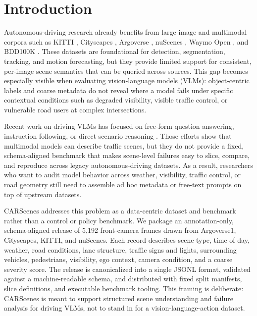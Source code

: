 \section{Introduction}

Autonomous-driving research already benefits from large image and multimodal corpora such as KITTI \cite{RefWorks:geiger2013vision}, Cityscapes \cite{RefWorks:cordts2016cityscapes}, Argoverse \cite{RefWorks:chang2019argoverse}, nuScenes \cite{RefWorks:caesar2020nuscenes}, Waymo Open \cite{RefWorks:sun2020scalability}, and BDD100K \cite{RefWorks:yu2020bdd100k}. These datasets are foundational for detection, segmentation, tracking, and motion forecasting, but they provide limited support for consistent, per-image scene semantics that can be queried across sources. This gap becomes especially visible when evaluating vision-language models (VLMs): object-centric labels and coarse metadata do not reveal where a model fails under specific contextual conditions such as degraded visibility, visible traffic control, or vulnerable road users at complex intersections.

Recent work on driving VLMs has focused on free-form question answering, instruction following, or direct scenario reasoning \cite{RefWorks:deruyttere2019talk2car,RefWorks:sima2024drivelm,RefWorks:qian2024nuscenesqa,RefWorks:ding2024holistic,RefWorks:rivera2025scenario}. Those efforts show that multimodal models can describe traffic scenes, but they do not provide a fixed, schema-aligned benchmark that makes scene-level failures easy to slice, compare, and reproduce across legacy autonomous-driving datasets. As a result, researchers who want to audit model behavior across weather, visibility, traffic control, or road geometry still need to assemble ad hoc metadata or free-text prompts on top of upstream datasets.

CARScenes addresses this problem as a data-centric dataset and benchmark rather than a control or policy benchmark. We package an annotation-only, schema-aligned release of 5,192 front-camera frames drawn from Argoverse1, Cityscapes, KITTI, and nuScenes. Each record describes scene type, time of day, weather, road conditions, lane structure, traffic signs and lights, surrounding vehicles, pedestrians, visibility, ego context, camera condition, and a coarse severity score. The release is canonicalized into a single JSONL format, validated against a machine-readable schema, and distributed with fixed split manifests, slice definitions, and executable benchmark tooling. This framing is deliberate: CARScenes is meant to support structured scene understanding and failure analysis for driving VLMs, not to stand in for a vision-language-action dataset.

